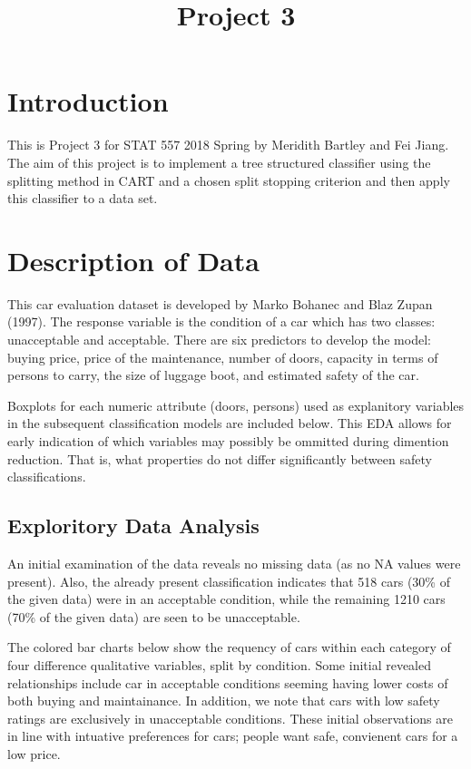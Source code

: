 \documentclass[]{article}
\title{Project 3}
\author{}
\date{}
\begin{document}
\maketitle

\section{Introduction}\label{introduction}

This is Project 3 for STAT 557 2018 Spring by Meridith Bartley and Fei
Jiang. The aim of this project is to implement a tree structured
classifier using the splitting method in CART and a chosen split
stopping criterion and then apply this classifier to a data set.

\section{Description of Data}\label{description-of-data}

This car evaluation dataset is developed by Marko Bohanec and Blaz Zupan
(1997). The response variable is the condition of a car which has two
classes: unacceptable and acceptable. There are six predictors to
develop the model: buying price, price of the maintenance, number of
doors, capacity in terms of persons to carry, the size of luggage boot,
and estimated safety of the car.

Boxplots for each numeric attribute (doors, persons) used as explanitory
variables in the subsequent classification models are included below.
This EDA allows for early indication of which variables may possibly be
ommitted during dimention reduction. That is, what properties do not
differ significantly between safety classifications.

\subsection{Exploritory Data Analysis}\label{exploritory-data-analysis}

An initial examination of the data reveals no missing data (as no NA
values were present). Also, the already present classification indicates
that 518 cars (30\% of the given data) were in an acceptable condition,
while the remaining 1210 cars (70\% of the given data) are seen to be
unacceptable.

The colored bar charts below show the requency of cars within each
category of four difference qualitative variables, split by condition.
Some initial revealed relationships include car in acceptable conditions
seeming having lower costs of both buying and maintainance. In addition,
we note that cars with low safety ratings are exclusively in
unacceptable conditions. These initial observations are in line with
intuative preferences for cars; people want safe, convienent cars for a
low price.
\end{document}
